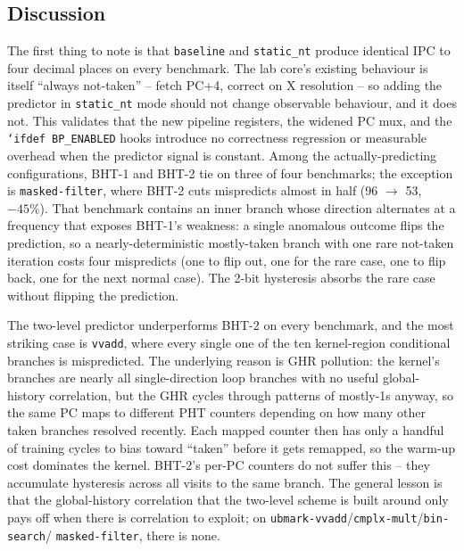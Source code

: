 \documentclass[10pt]{article}
\begin{document}
\subsection{Discussion}

The first thing to note is that \texttt{baseline} and
\texttt{static\_nt} produce identical IPC to four decimal places on
every benchmark. The lab core's existing behaviour is itself
``always not-taken'' -- fetch PC+4, correct on X resolution -- so
adding the predictor in \texttt{static\_nt} mode should not change
observable behaviour, and it does not. This validates that the new
pipeline registers, the widened PC mux, and the \texttt{`ifdef BP\_ENABLED}
hooks introduce no correctness regression or measurable overhead
when the predictor signal is constant. Among the actually-predicting
configurations, BHT-1 and BHT-2 tie on three of four benchmarks; the
exception is \texttt{masked-filter}, where BHT-2 cuts mispredicts
almost in half (96 $\to$ 53, $-45\%$). That benchmark contains an
inner branch whose direction alternates at a frequency that exposes
BHT-1's weakness: a single anomalous outcome flips the prediction, so
a nearly-deterministic mostly-taken branch with one rare not-taken
iteration costs four mispredicts (one to flip out, one for the rare
case, one to flip back, one for the next normal case). The 2-bit
hysteresis absorbs the rare case without flipping the prediction.

The two-level predictor underperforms BHT-2 on every benchmark, and
the most striking case is \texttt{vvadd}, where every single one of
the ten kernel-region conditional branches is mispredicted. The
underlying reason is GHR pollution: the kernel's branches are nearly
all single-direction loop branches with no useful global-history
correlation, but the GHR cycles through patterns of mostly-1s
anyway, so the same PC maps to different PHT counters depending on
how many other taken branches resolved recently. Each mapped counter
then has only a handful of training cycles to bias toward ``taken''
before it gets remapped, so the warm-up cost dominates the kernel.
BHT-2's per-PC counters do not suffer this -- they accumulate
hysteresis across all visits to the same branch. The general lesson
is that the global-history correlation that the two-level scheme is
built around only pays off when there is correlation to exploit; on
\texttt{ubmark-vvadd}/\texttt{cmplx-mult}/\texttt{bin-search}/
\texttt{masked-filter}, there is none.
\end{document}
